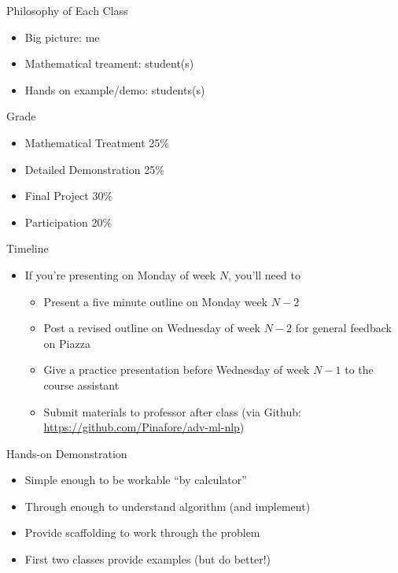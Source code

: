 \documentclass[compress]{beamer}
\begin{document}
\begin{frame}{Philosophy of Each Class}
  \begin{itemize}
    \item Big picture: me
    \item Mathematical treament: student(s) 
    \item Hands on example/demo: students(s) 
  \end{itemize}
\end{frame}

\begin{frame}{Grade}

\begin{itemize}
\item Mathematical Treatment 25\%
\item Detailed Demonstration 25\%
\item Final Project 30\%
\item Participation 20\%
\end{itemize}

\end{frame}

\begin{frame}{Timeline}

\begin{itemize}
\item If you're presenting on Monday of week $N$, you'll need to
\begin{itemize}
\item Present a five minute outline on Monday week $N-2$ 
\item Post a revised outline on Wednesday of week $N-2$ for general
  feedback on Piazza 
\item Give a practice presentation before Wednesday of week $N-1$ to the course assistant
\item Submit materials to professor after class (via Github: \url{https://github.com/Pinafore/adv-ml-nlp})
\end{itemize}
\end{itemize}


\end{frame}


\begin{frame}{Hands-on Demonstration}

  \begin{itemize}
    \item Simple enough to be workable ``by calculator''
    \item Through enough to understand algorithm (and implement)
    \item Provide scaffolding to work through the problem
      \pause
    \item First two classes provide examples (but do better!)
  \end{itemize}

\end{frame}
\end{document}

